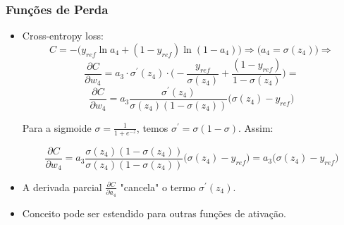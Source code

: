 \documentclass[tikz,10pt]{beamer}
\begin{document}
\begin{frame}
	\frametitle{Funções de Perda}
	
	\begin{itemize}
		\item Cross-entropy loss:
		$$C = - \bigg(y_{ref} \ln{a_4} + (1-y_{ref}) \ln{(1 - a_4)} \bigg) \Rightarrow \Big(a_4 = \sigma(z_4) \Big) \Rightarrow $$
		$$\frac{ \partial C } {\partial w_4 } = a_3 \cdot \sigma^{'}(z_4) \cdot \bigg(- \frac{ y_{ref} }{ \sigma(z_4)} + \frac{(1 - y_{ref})}{1 -  \sigma(z_4)} \bigg) = $$ 
		$$ \frac{ \partial C } {\partial w_4 }  = a_3 \frac{ \sigma^{'}(z_4) } { \sigma(z_4)(1 -  \sigma(z_4)) }  \Big(\sigma(z_4) - y_{ref}\Big)$$
		
		Para a sigmoide $\sigma = \frac{1}{1 + e^{-z}}$, temos $\sigma^{'} = \sigma(1-\sigma)$. Assim:
		
		$$ \frac{ \partial C } {\partial w_4 }  = a_3 \frac{ \sigma(z_4)(1 -  \sigma(z_4))   } { \sigma(z_4)(1 -  \sigma(z_4)) }  \Big(\sigma(z_4) - y_{ref}\Big) = a_3 \Big(\sigma(z_4) - y_{ref}\Big) $$
		
		\item A derivada parcial $\frac{ \partial C } {\partial a_4 }$ "cancela" o termo $\sigma^{'}(z_4)$.
		\item Conceito pode ser estendido para outras funções de ativação.
		
	\end{itemize}
	
\end{frame}


\end{document}
